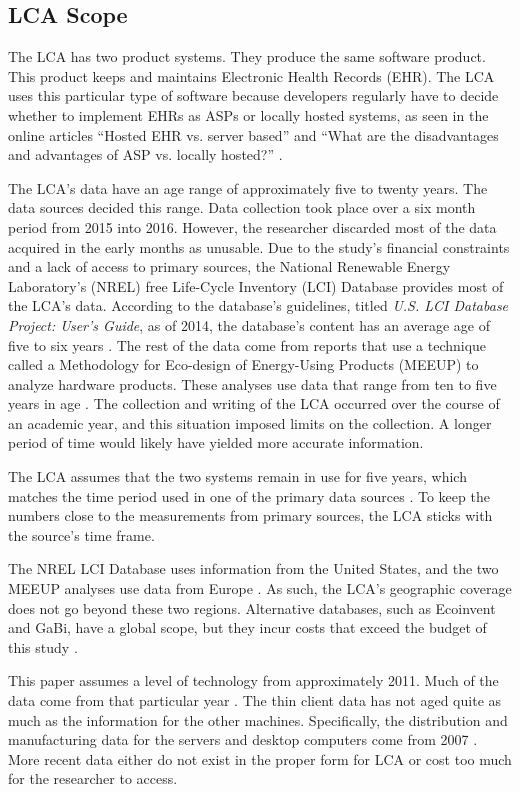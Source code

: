 \documentclass[final,journal,10pt,letterpaper,oneside,twocolumn,compsoc]%
{IEEEtran}
\begin{document}
\subsection{LCA Scope}
The LCA has two product systems. They produce the same software product. This
product keeps and maintains Electronic Health Records (EHR). The LCA uses this
particular type of software because developers regularly have to decide whether
to
implement EHRs as ASPs or locally hosted systems, as seen in the online articles
``Hosted EHR vs. server based'' and ``What are the disadvantages and
advantages of ASP vs. locally hosted?'' \cite{mds} \cite{hrsa}.

The LCA's data have an age range of approximately five to twenty years. The
data sources decided this range. Data
collection took place over a six month period from 2015 into 2016. However, the
researcher discarded
most of the data acquired in the early months as unusable. Due to the study's
financial constraints and a
lack of access to primary sources, the National Renewable Energy Laboratory's
(NREL) free Life-Cycle Inventory (LCI) Database provides most of the LCA's
data. According to the database's guidelines, titled \textit{U.S. LCI Database
Project: User's Guide}, as of 2014, the database's content has an average age
of five to six years
\cite{database}. The rest of the data come from reports that use a technique
called a Methodology for Eco-design of Energy-Using Products (MEEUP) to analyze
hardware products. These analyses use data that
range from ten to five years in age \cite{client} \cite{desktop}. The collection
and writing
of the LCA occurred over the course of an academic year, and this situation
imposed limits on the collection. A longer period of time would likely have
yielded more accurate information.

The LCA assumes that the two systems remain in use for five years, which
matches the time period used in one of the primary data sources \cite{client}.
To keep the numbers close to the measurements from primary sources, the LCA
sticks with the source's time frame.

The NREL LCI Database uses information from the United States, and
the two MEEUP analyses use data from Europe \cite{database} \cite{client}
\cite{desktop}. As
such, the LCA's geographic coverage does not go beyond these two regions.
Alternative databases, such as Ecoinvent and GaBi, have a global scope, but they
incur costs that exceed the budget of this study \cite{textbook}.

This paper assumes a level of technology from approximately 2011. Much of the
data come
from that particular year \cite{client}. The thin client data has not aged quite
as much as
the information for the other machines. Specifically, the distribution and
manufacturing data for the
servers and desktop computers come from 2007 \cite{desktop}. More recent data
either do not exist in the proper form for LCA or cost too much for the
researcher to access.
\end{document}
